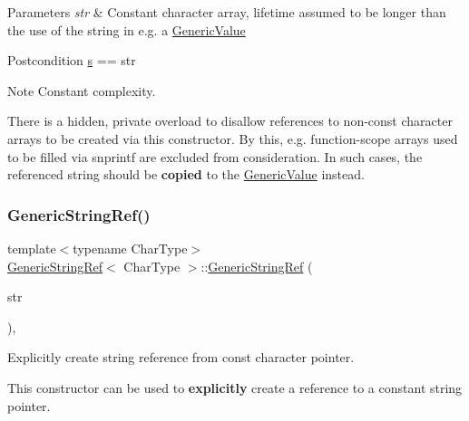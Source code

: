 \begin{DoxyParams}{Parameters}
{\em str} & Constant character array, lifetime assumed to be longer than the use of the string in e.\+g. a \hyperlink{classGenericValue}{Generic\+Value}\\
\hline
\end{DoxyParams}
\begin{DoxyPostcond}{Postcondition}
\hyperlink{structGenericStringRef_aec7a5900ea6f3e42f0ea8403d5135103}{s} == str
\end{DoxyPostcond}
\begin{DoxyNote}{Note}
Constant complexity. 

There is a hidden, private overload to disallow references to non-\/const character arrays to be created via this constructor. By this, e.\+g. function-\/scope arrays used to be filled via {\ttfamily snprintf} are excluded from consideration. In such cases, the referenced string should be {\bfseries copied} to the \hyperlink{classGenericValue}{Generic\+Value} instead. 
\end{DoxyNote}
\mbox{\label{structGenericStringRef_a9e80d81d5ad49cf0fb4128ace8c548d9}} 
\subsubsection{\texorpdfstring{Generic\+String\+Ref()}{GenericStringRef()}\hspace{0.1cm}{\footnotesize\ttfamily [2/6]}}
{\footnotesize\ttfamily template$<$typename Char\+Type$>$ \\
\hyperlink{structGenericStringRef}{Generic\+String\+Ref}$<$ Char\+Type $>$\+::\hyperlink{structGenericStringRef}{Generic\+String\+Ref} (\begin{DoxyParamCaption}\item[{const Char\+Type $\ast$}]{str }\end{DoxyParamCaption})\hspace{0.3cm}{\ttfamily [inline]}, {\ttfamily [explicit]}}



Explicitly create string reference from {\ttfamily const} character pointer. 

This constructor can be used to {\bfseries explicitly} create a reference to a constant string pointer.

